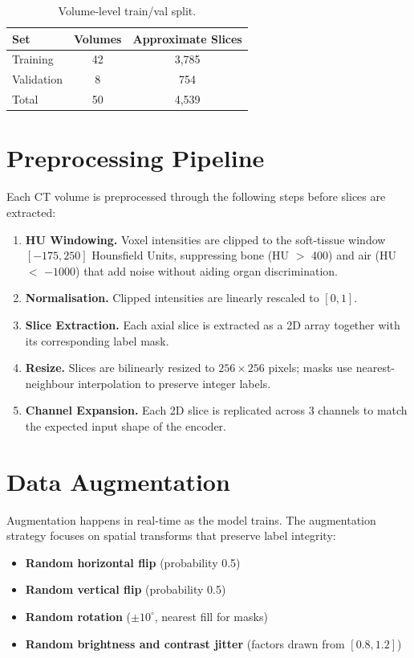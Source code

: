 \begin{table}[h!]
\centering
\caption{Volume-level train/val split.}
\label{tab:split}
\begin{tabular}{lcc}
\toprule
\textbf{Set} & \textbf{Volumes} & \textbf{Approximate Slices} \\
\midrule
Training   & 42 & 3{,}785 \\
Validation & 8  &   754   \\
Total      & 50 & 4{,}539 \\
\bottomrule
\end{tabular}
\end{table}

\section{Preprocessing Pipeline}

Each CT volume is preprocessed through the following steps before slices are extracted:

\begin{enumerate}
    \item \textbf{HU Windowing.}  Voxel intensities are clipped to the soft-tissue window
          $[-175, 250]$ Hounsfield Units, suppressing bone (HU $>$ 400) and air (HU $<$ $-1000$)
          that add noise without aiding organ discrimination.
    \item \textbf{Normalisation.}  Clipped intensities are linearly rescaled to $[0, 1]$.
    \item \textbf{Slice Extraction.}  Each axial slice is extracted as a 2D array together
          with its corresponding label mask.
    \item \textbf{Resize.}  Slices are bilinearly resized to $256 \times 256$ pixels; masks use
          nearest-neighbour interpolation to preserve integer labels.
    \item \textbf{Channel Expansion.}  Each 2D slice is replicated across 3 channels to match
          the expected input shape of the encoder.
\end{enumerate}

\section{Data Augmentation}

Augmentation happens in real-time as the model trains. The augmentation strategy focuses on spatial transforms that preserve label integrity:

\begin{itemize}
    \item \textbf{Random horizontal flip} (probability 0.5)
    \item \textbf{Random vertical flip} (probability 0.5)
    \item \textbf{Random rotation} ($\pm 10^\circ$, nearest fill for masks)
    \item \textbf{Random brightness and contrast jitter} (factors drawn from $[0.8, 1.2]$)
\end{itemize}

